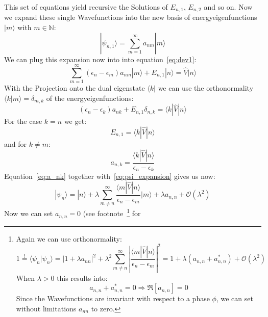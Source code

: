 This set of equations yield recursive the Solutions of $E_{n,1}$,
$E_{n,2}$ and so on. Now we expand these single Wavefunctions 
into the new basis of energyeigenfunctions $|m \rangle$ with $m\in 
\mathbb{N}$:
\begin{equation}
    |\psi_{n,1}\rangle = \sum_{m=1}^{\infty} a_{nm} |m \rangle
    \label{eq:psi_expansion}
\end{equation}
We can plug this expansion now into into equation~\eqref{eq:dev1}:
\begin{equation}
    \sum_{m=1}^{\infty} (\epsilon_n - \epsilon_m) a_{nm} |m\rangle
    + E_{n,1} |n\rangle = \hat{V}|n \rangle
\end{equation}
With the Projection onto the dual eigenstate $\langle k|$ we can
use the orthonormality $\langle k | m \rangle = \delta_{m,k}$ 
of the energyeigenfunctions:
\begin{equation}
     (\epsilon_n - \epsilon_k) a_{nk} 
     + E_{n,1}\delta_{n,k}  = \langle k |\hat{V}|n \rangle
\end{equation}
For the case $k = n$ we get:
\begin{equation}
    E_{n,1} = \langle k |\hat{V}|n \rangle
\end{equation}
and for $k\neq m$:
\begin{equation}
    a_{n,k} = \frac{\langle k |\hat{V}|n \rangle}
    {\epsilon_n - \epsilon_k} \label{eq:a_nk}
\end{equation}
Equation~\eqref{eq:a_nk} together with~\eqref{eq:psi_expansion} 
gives us now:
\begin{equation}
    |\psi_{n}\rangle = |n\rangle + \lambda \sum_{m\neq n}^{\infty}
    \frac{\langle m |\hat{V}|n \rangle}{\epsilon_n - \epsilon_m}  
    |m \rangle + \lambda a_{n,n} + \mathcal{O}(\lambda^2)
\end{equation}
Now we can set $a_{n,n}=0$ (see footnote~\footnote{
Again we can use orthonormality:
\begin{equation*}
    1\overset{!}{=} \langle \psi_n|\psi_{n}\rangle 
    = \left | 1 + \lambda a_{nn} \right |^2 + \lambda^2
    \sum_{m\neq n}^{\infty}
    \left | \frac{\langle m |\hat{V}|n \rangle}
        {\epsilon_n - \epsilon_m} \right |^2 = 
    1 + \lambda (a_{n,n} + a^*_{n,n}) + \mathcal{O}(\lambda^2)
\end{equation*}
When $\lambda > 0 $ this results into:
\begin{equation*}
    a_{n,n} + a^*_{n,n} = 0 \Rightarrow \Re  [a_{n,n}] = 0
\end{equation*}
Since the Wavefunctions 
are invariant with respect to a phase $\phi$,
we can set without limitations $a_{nn}$ to zero.} for

